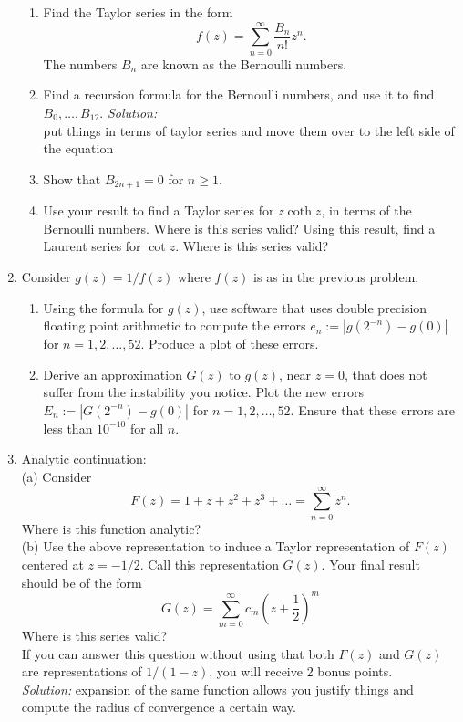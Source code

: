 \documentclass[10pt]{amsart}
\theoremstyle{nonumberplain}
\begin{document}
\begin{enumerate}[label={\bf {\arabic*}:}]
\begin{enumerate}
\item Find the Taylor series in the form
$$
f(z)=\sum_{n=0}^{\infty} \frac{B_n}{n!} z^n .
$$
The numbers $B_n$ are known as the Bernoulli numbers.
\item Find a recursion formula for the Bernoulli numbers, and use it to find $B_0, \ldots, B_{12}$.
\textit{Solution:}\\
put things in terms of taylor series and move them over to the left side of the equation
\item Show that $B_{2 n+1}=0$ for $n \geq 1$.
\item Use your result to find a Taylor series for $z \operatorname{coth} z$, in terms of the Bernoulli numbers. Where is this series valid? Using this result, find a Laurent series for $\cot z$. Where is this series valid?    \\
\end{enumerate}
\newpage

\item Consider $g(z) = 1/f(z)$ where $f(z)$ is as in the previous
  problem.
  \begin{enumerate}
  \item Using the formula for $g(z)$, use software that uses double
    precision floating point arithmetic to compute the errors $e_n:=
    |g(2^{-n}) - g(0)|$ for $n= 1,2,\ldots, 52$.  Produce a plot of
    these errors.
  \item Derive an approximation $G(z)$ to $g(z)$, near $z = 0$, that does not suffer
    from the instability you notice.  Plot the new errors $E_n:=
    |G(2^{-n}) - g(0)|$ for $n= 1,2,\ldots, 52$.  Ensure that these
    errors are less than $10^{-10}$ for all $n$.\\
\end{enumerate}
\newpage

\item Analytic continuation: \\
(a) Consider
$$
F(z)=1+z+z^2+z^3+\ldots=\sum_{n=0}^{\infty} z^n .
$$
Where is this function analytic? \\
(b) Use the above representation to induce a Taylor representation of $F(z)$ centered at $z=-1 / 2$. Call this representation $G(z)$. Your final result should be of the form
$$
G(z)=\sum_{m=0}^{\infty} c_m\left(z+\frac{1}{2}\right)^m
$$
Where is this series valid? \\
If you can answer this question without
using that both $F(z)$ and $G(z)$ are representations of $1 /(1-z)$,
you will receive 2 bonus points.\\
\textit{Solution:}
expansion of the same function allows you justify things and compute the radius of convergence a certain way. \\


\end{enumerate}
\end{document}
